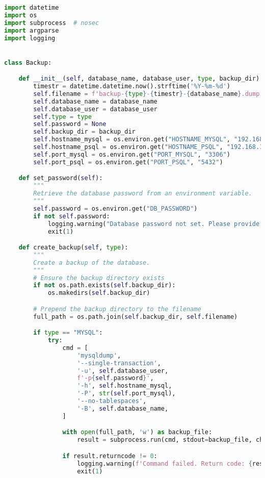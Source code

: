 \begin{lstlisting}[language=Python, caption={Python-script voor back-ups en retentiebeleid.}]
import datetime
import os
import subprocess  # nosec
import argparse
import logging


class Backup:

    def __init__(self, database_name, database_user, type, backup_dir):
        timestr = datetime.datetime.now().strftime('%Y-%m-%d')
        self.filename = f'backup-{type}-{timestr}-{database_name}.dump'
        self.database_name = database_name
        self.database_user = database_user
        self.type = type
        self.password = None
        self.backup_dir = backup_dir
        self.hostname_mysql = os.environ.get("HOSTNAME_MYSQL", "192.168.1.53")
        self.hostname_psql = os.environ.get("HOSTNAME_PSQL", "192.168.1.53")
        self.port_mysql = os.environ.get("PORT_MYSQL", "3306")
        self.port_psql = os.environ.get("PORT_PSQL", "5432")

    def set_password(self):
        """
        Retrieve the database password from an environment variable.
        """
        self.password = os.environ.get("DB_PASSWORD")
        if not self.password:
            logging.warning("Database password not set. Please provide the DB_PASSWORD environment variable.")
            exit(1)

    def create_backup(self, type):
        """
        Create a backup of the database.
        """
        # Ensure the backup directory exists
        if not os.path.exists(self.backup_dir):
            os.makedirs(self.backup_dir)

        # Prepend the backup directory to the filename
        full_path = os.path.join(self.backup_dir, self.filename)

        if type == "MYSQL":
            try:
                cmd = [
                    'mysqldump',
                    '--single-transaction',
                    '-u', self.database_user,
                    f'-p{self.password}',
                    '-h', self.hostname_mysql,
                    '-P', str(self.port_mysql),
                    '--no-tablespaces',
                    '-B', self.database_name,
                ]

                with open(full_path, 'w') as backup_file:
                    result = subprocess.run(cmd, stdout=backup_file, check=True)  # nosec

                if result.returncode != 0:
                    logging.warning(f'Command failed. Return code: {result.returncode}')
                    exit(1)


\end{lstlisting}
